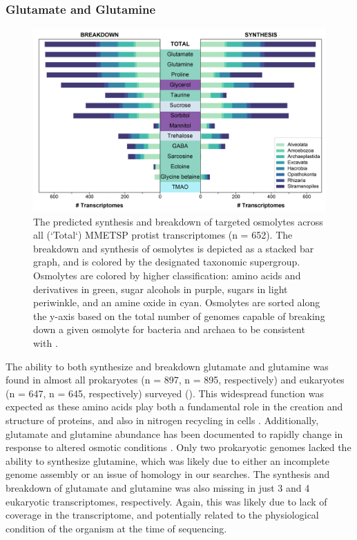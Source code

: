 \documentclass[utf8]{frontiersSCNS} %
\begin{document}
\subsubsection*{Glutamate and Glutamine}
\begin{figure}[t!]
    \centering
    \includegraphics[width = 0.9\columnwidth]{Figures/Eukaryote-Synthesis-Breakdown-v2021-03-14-01.png}
    \caption{The predicted synthesis and breakdown of targeted osmolytes across all (`Total`) MMETSP protist transcriptomes (n = 652). The breakdown and synthesis of osmolytes is depicted as a stacked bar graph, and is colored by the designated taxonomic supergroup. Osmolytes are colored by higher classification: amino acids and derivatives in green, sugar alcohols in purple, sugars in light periwinkle, and an amine oxide in cyan. Osmolytes are sorted along the y-axis based on the total number of genomes capable of breaking down a given osmolyte for bacteria and archaea to be consistent with .}
    \label{fig:euk}
\end{figure}
The ability to both synthesize and breakdown glutamate and glutamine was found in almost all prokaryotes (n = 897, n = 895, respectively) and eukaryotes (n = 647, n = 645, respectively) surveyed (). This widespread function was expected as these amino acids play both a fundamental role in the creation and structure of proteins, and also in nitrogen recycling in cells \citep{Reitzer2003}. Additionally, glutamate and glutamine abundance has been documented to rapidly change in response to altered osmotic conditions \citep{Saum2008}. Only two prokaryotic genomes lacked the ability to synthesize glutamine, which was likely due to either an incomplete genome assembly or an issue of homology in our searches. The synthesis and breakdown of glutamate and glutamine was also missing in just 3 and 4 eukaryotic transcriptomes, respectively. Again, this was likely due to lack of coverage in the transcriptome, and potentially related to the physiological condition of the organism at the time of sequencing.
\end{document}
